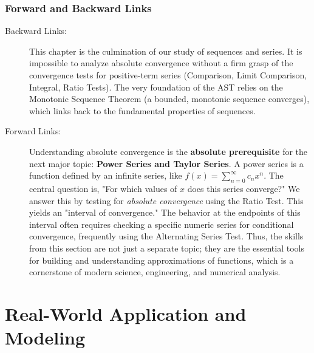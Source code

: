 \documentclass{article}
\begin{document}
\section{Forward and Backward Links}
\begin{description}
    \item[Backward Links:] This chapter is the culmination of our study of sequences and series. It is impossible to analyze absolute convergence without a firm grasp of the convergence tests for positive-term series (Comparison, Limit Comparison, Integral, Ratio Tests). The very foundation of the AST relies on the Monotonic Sequence Theorem (a bounded, monotonic sequence converges), which links back to the fundamental properties of sequences.
    
    \item[Forward Links:] Understanding absolute convergence is the \textbf{absolute prerequisite} for the next major topic: \textbf{Power Series and Taylor Series}. A power series is a function defined by an infinite series, like $f(x) = \sum_{n=0}^\infty c_n x^n$. The central question is, "For which values of $x$ does this series converge?" We answer this by testing for \textit{absolute convergence} using the Ratio Test. This yields an "interval of convergence." The behavior at the endpoints of this interval often requires checking a specific numeric series for conditional convergence, frequently using the Alternating Series Test. Thus, the skills from this section are not just a separate topic; they are the essential tools for building and understanding approximations of functions, which is a cornerstone of modern science, engineering, and numerical analysis.
\end{description}

\part{Real-World Application and Modeling}
\end{document}
